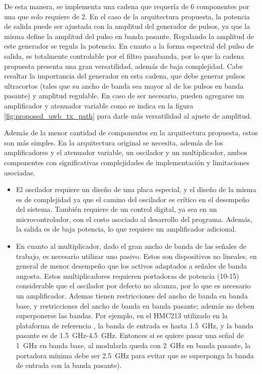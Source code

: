 De esta manera, se implementa una cadena que requería de 6 componentes por una
que solo requiere de 2. En el caso de la arquitectura propuesta, la potencia de
salida puede ser ajustada con la amplitud del generador de pulsos, ya que la
misma define la amplitud del pulso en banda pasante. Regulando la amplitud de
este generador se regula la potencia. En cuanto a la forma espectral del pulso
de salida, es totalmente controlable por el filtro pasabanda, por lo que la
cadena propuesta presenta una gran versatilidad, además de baja complejidad.
Cabe resaltar la importancia del generador en esta cadena, que debe generar
pulsos ultracortos (tales que su ancho de banda sea mayor al de los pulsos en
banda pasante) y amplitud regulable. En caso de ser necesario, pueden agregarse
un amplificador y atenuador variable como se indica en la figura
\ref{fig:proposed_uwb_tx_path} para darle más versatilidad al ajuste de
amplitud.

Además de la menor cantidad de componentes en la arquitectura propuesta, estos
son más simples. En la arquitectura original se necesita, además de los
amplificadores y el atenuador variable, un oscilador y un multiplicador, ambos
componentes con significativas complejidades de implementación y limitaciones
asociadas.

\begin{itemize}
    \item El oscilador requiere un diseño de una placa especial, y el diseño de
        la misma es de complejidad ya que el camino del  oscilador es crítico en
        el desempeño del sistema. También requiere de un control digital, ya sea
        en un microcontrolador, con el costo asociado al desarrollo del
        programa. Además, la salida es de baja potencia, lo que requiere un
        amplificador adicional.
    \item En cuanto al multiplicador, dado el gran ancho de banda de las señales
        de trabajo, es necesario utilizar uno pasivo. Estos son dispositivos no
        lineales, en general de menor desempeño que los activos adaptados a
        señales de banda angosta.  Estos multiplicadores requieren portadoras de
        potencia (\qty{10}{\dBm}-\qty{15}{\dBm}) considerable que el oscilador
        por defecto no alcanza, por lo que es necesario un amplificador. Ademas
        tienen restricciones del ancho de banda en banda base, y restricciones
        del ancho de banda en banda pasante; además no deben superponerse las
        bandas. Por ejemplo, en el HMC213 utilizado en la plataforma de
        referencia \cite{Altieri2021}, la banda de entrada es hasta
        \qty{1.5}{\giga\hertz}, y la banda pasante es de
        \qty{1.5}{\giga\hertz}-\qty{4.5}{\giga\hertz}. Entonces si se quiere
        pasar una señal de \qty{1}{\giga\hertz} en banda base, al modularla
        queda con \qty{2}{\giga\hertz} en banda pasante, la portadora mínima
        debe ser \qty{2.5}{\giga\hertz} para evitar que se superponga la banda
        de entrada con la banda pasante).
\end{itemize}

